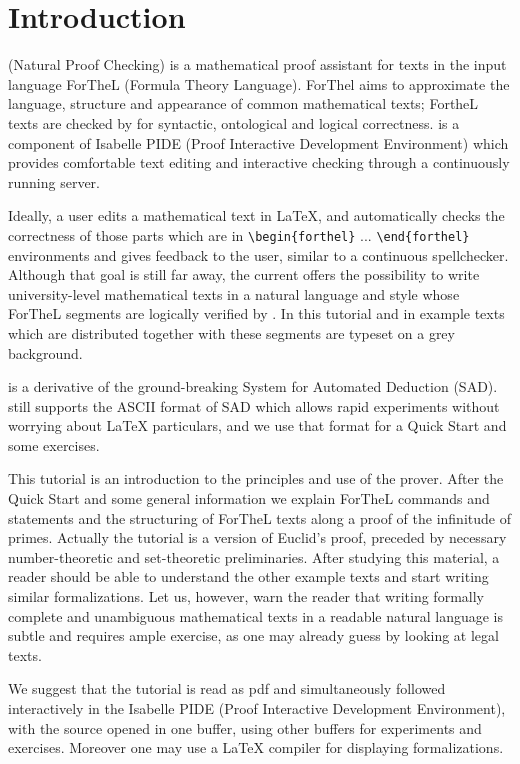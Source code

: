 \documentclass{stex}
\begin{document}
\section{Introduction}

\Naproche{} (Natural Proof Checking) is a mathematical proof assistant
for texts in the input language ForTheL (Formula Theory Language).
ForThel aims to approximate the
language, structure and appearance of common mathematical texts;
FortheL texts are checked by \Naproche{} for syntactic, ontological
and logical correctness. \Naproche{} is a component of
Isabelle PIDE (Proof Interactive Development Environment) which provides
comfortable text editing and interactive checking through a continuously
running \Naproche{} server.

Ideally, a user edits a mathematical text in \LaTeX{}, and
\Naproche{} automatically checks the correctness of those parts which are
in \verb+\begin+\verb+{forthel}+ ... \verb+\end{forthel}+
environments and gives
feedback to the user, similar to a continuous spellchecker.
Although that goal is still far away, the current \Naproche{} offers
the possibility to write university-level mathematical texts
in a natural language and style whose ForTheL segments are logically
verified by \Naproche{}. In this tutorial and in example texts
which are distributed together with \Naproche{} these segments
are typeset on a grey background.

\Naproche{} is a derivative of the ground-breaking System
for Automated Deduction (SAD). \Naproche{} still supports the
ASCII format  of SAD which allows rapid
experiments without worrying about LaTeX particulars, and we
use that format for a Quick Start and some exercises.

This tutorial is an introduction to the principles and
use of the \Naproche{} prover. After the Quick Start and
some general information we explain
ForTheL commands and statements and the structuring of ForTheL texts
along a proof of the infinitude of primes. Actually the tutorial is
a version of Euclid's proof, preceded by
necessary number-theoretic and set-theoretic preliminaries.
After studying this material, a reader should be able to understand the
other example texts and start writing similar formalizations.
Let us, however, warn the reader that writing formally complete
and unambiguous mathematical texts in a readable natural language
is subtle and requires ample exercise, as one may already guess by
looking at legal texts.

We suggest that the tutorial is read as pdf and simultaneously followed
interactively in the Isabelle
PIDE (Proof Interactive Development Environment), with the source
 opened in one buffer, using other buffers
for experiments and exercises. Moreover one may use a \LaTeX{} compiler
for displaying  formalizations.
\end{document}
